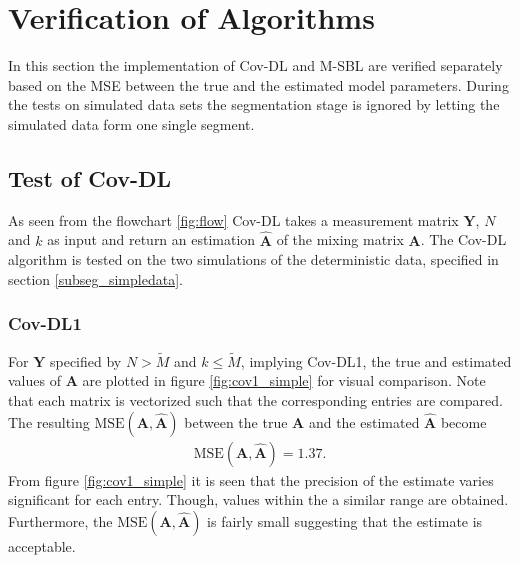 \section{Verification of Algorithms}
In this section the implementation of Cov-DL and M-SBL are verified separately based on the MSE between the true and the estimated model parameters.
During the tests on simulated data sets the segmentation stage is ignored by letting the simulated data form one single segment.    

\subsection{Test of Cov-DL}
As seen from the flowchart \ref{fig:flow} Cov-DL takes a measurement matrix $\mathbf{Y}$, $N$ and $k$ as input and return an estimation $\hat{\mathbf{A}}$ of the mixing matrix $\mathbf{A}$. 
The Cov-DL algorithm is tested on the two simulations of the deterministic data, specified in section \ref{subseg_simpledata}. 

\subsubsection{Cov-DL1}
For $\mathbf{Y}$ specified by $N > \widetilde{M}$ and $k \leq \widetilde{M}$, implying Cov-DL1, the true and estimated values of $\mathbf{A}$ are plotted in figure \ref{fig:cov1_simple} for visual comparison. 
Note that each matrix is vectorized such that the corresponding entries are compared.  
The resulting $\text{MSE}(\mathbf{A}, \hat{\mathbf{A}})$ between the true $\mathbf{A}$ and the estimated $\hat{\mathbf{A}}$ become  
\begin{align*}
\text{MSE}(\mathbf{A}, \hat{\mathbf{A}}) = 1.37.
\end{align*}
From figure \ref{fig:cov1_simple} it is seen that the precision of the estimate varies significant for each entry. 
Though, values within the a similar range are obtained.
Furthermore, the $\text{MSE}(\mathbf{A}, \hat{\mathbf{A}})$ is fairly small suggesting that the estimate is acceptable.


